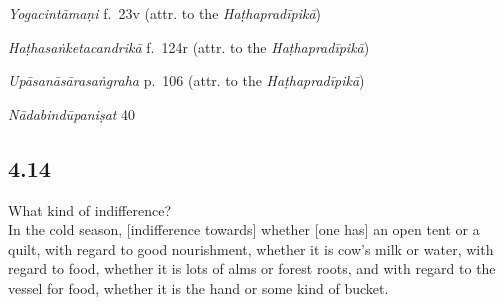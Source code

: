 \begin{ekdosis}

\begin{testimonia}[hp04_013]
\emph{Yogacintāmaṇi} f.~23v (attr. to the \emph{Haṭhapradīpikā})
\begin{versinnote}
\end{versinnote}

\emph{Haṭhasaṅketacandrikā} f.~124r (attr. to the \emph{Haṭhapradīpikā})
\begin{versinnote}
\tl{\var{evāvadhārayet ] emend., evaṃ vadhārayet ms. 2244}\\!}
\end{versinnote}

\emph{Upāsanāsārasaṅgraha} p.~106 (attr. to the \emph{Haṭhapradīpikā})
\begin{versinnote}
\end{versinnote}

\emph{Nādabindūpaniṣat} 40
\begin{versinnote}
\end{versinnote}

\end{testimonia}


\subsection*{4.14}
\begin{translation}[hp04_014]
What kind of indifference?\\
In the cold season, [indifference towards] whether [one has] an open tent or a quilt, with regard to good nourishment, whether it is cow's milk or water, with regard to food, whether it is lots of alms or forest roots, and with regard to the vessel for food, whether it is the hand or some kind of bucket.
%
\end{translation}


\end{ekdosis}
